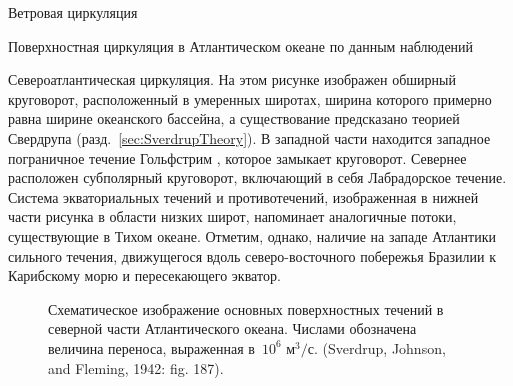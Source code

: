 \begin{chapter}{Ветровая циркуляция}
\begin{section}{Поверхностная циркуляция в Атлантическом океане по данным наблюдений}
\begin{paragraph}{Североатлантическая циркуляция.}
На этом рисунке изображен обширный круговорот, расположенный в умеренных 
широтах, ширина которого примерно равна ширине океанского бассейна,
а существование предсказано теорией Свердрупа 
(разд.~\ref{sec:SverdrupTheory}). В западной части находится западное
пограничное течение Гольфстрим%
, которое замыкает
круговорот. Севернее расположен субполярный круговорот, включающий в себя
Лабрадорское течение. Система экваториальных течений и противотечений,
изображенная в нижней части рисунка в области низких широт, напоминает
аналогичные потоки, существующие в Тихом океане. Отметим, однако, наличие
на западе Атлантики сильного течения, движущегося вдоль северо-восточного 
побережья Бразилии к Карибскому морю и пересекающего экватор.
%

\begin{figure}[t!]
\caption{Схематическое изображение основных поверхностных течений в северной
части Атлантического океана. Числами обозначена величина 
переноса, выраженная 
в~$10^6\text{~м}^3/\text{с}$. (Sverdrup, Johnson, and Fleming, 1942: fig. 187).}
\label{fig:NAtlcur1}
\end{figure}
%
%


\end{paragraph}
\end{section}
\end{chapter}
